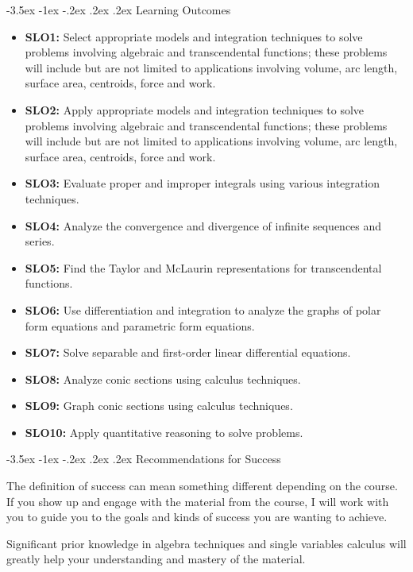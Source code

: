 \documentclass{article}
\makeatletter
\renewcommand\section{\@startsection{section}{1}{0pt}%
  {-3.5ex \@plus -1ex \@minus -.2ex}%
  {.2ex \@plus.2ex}%
  {\normalfont\Large\bfseries}} %
\makeatother
\begin{document}
\section{Learning Outcomes}

\begin{itemize}
\item \textbf{SLO1:} Select appropriate models and integration techniques to solve problems involving algebraic and transcendental functions; these problems will include but are not limited to applications involving volume, arc length, surface area, centroids, force and work.
\item \textbf{SLO2:} Apply appropriate models and integration techniques to solve problems involving algebraic and transcendental functions; these problems will include but are not limited to applications involving volume, arc length, surface area, centroids, force and work.
\item \textbf{SLO3:} Evaluate proper and improper integrals using various integration techniques.
\item \textbf{SLO4:} Analyze the convergence and divergence of infinite sequences and series.
\item \textbf{SLO5:} Find the Taylor and McLaurin representations for transcendental functions.
\item \textbf{SLO6:} Use differentiation and integration to analyze the graphs of polar form equations and parametric form equations.
\item \textbf{SLO7:} Solve separable and first-order linear differential equations.
\item \textbf{SLO8:} Analyze conic sections using calculus techniques.
\item \textbf{SLO9:} Graph conic sections using calculus techniques.
\item \textbf{SLO10:} Apply quantitative reasoning to solve problems.
\end{itemize}

\section{Recommendations for Success}

The definition of success can mean something different depending on the course. If you show up and engage with the material from the course, I will work with you to guide you to the goals and kinds of success you are wanting to achieve.

Significant prior knowledge in algebra techniques and single variables calculus will greatly help your understanding and mastery of the material.
\end{document}
